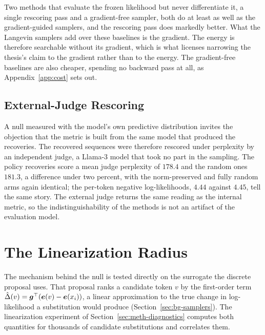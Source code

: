 Two methods that evaluate the frozen likelihood but never differentiate it, a single rescoring pass and a gradient-free sampler, both do at least as well as the gradient-guided samplers, and the rescoring pass does markedly better. What the Langevin samplers add over these baselines is the gradient. The energy is therefore searchable without its gradient, which is what licenses narrowing the thesis's claim to the gradient rather than to the energy. The gradient-free baselines are also cheaper, spending no backward pass at all, as Appendix~\ref{app:cost} sets out.

\subsection{External-Judge Rescoring}
\label{sec:results-judge}

A null measured with the model's own predictive distribution invites the objection that the metric is built from the same model that produced the recoveries. The recovered sequences were therefore rescored under perplexity by an independent judge, a Llama-3 model that took no part in the sampling. The policy recoveries score a mean judge perplexity of $178.4$ and the random ones $181.3$, a difference under two percent, with the norm-preserved and fully random arms again identical; the per-token negative log-likelihoods, $4.44$ against $4.45$, tell the same story.
The external judge returns the same reading as the internal metric, so the indistinguishability of the methods is not an artifact of the evaluation model.

\section{The Linearization Radius}
\label{sec:results-linradius}

The mechanism behind the null is tested directly on the surrogate the discrete proposal uses. That proposal ranks a candidate token $v$ by the first-order term $\hat{\Delta}(v) = \bm{g}^\top(\bm{e}(v) - \bm{e}(x_i))$, a linear approximation to the true change in log-likelihood a substitution would produce (Section~\ref{sec:bg-samplers}). The linearization experiment of Section~\ref{sec:meth-diagnostics} computes both quantities for thousands of candidate substitutions and correlates them.

